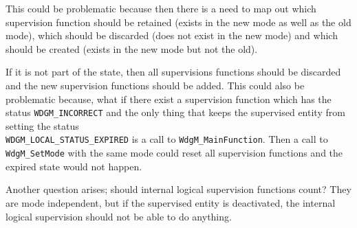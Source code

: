 This could be problematic because then there is a need to map out
which supervision function should be retained (exists in the new mode
as well as the old mode), which should be discarded (does not exist in
the new mode) and which should be created (exists in the new mode but
not the old).

If it is not part of the state, then all supervisions functions should
be discarded and the new supervision functions should be added.  This
could also be problematic because, what if there exist a supervision
function which has the status \lstinline!WDGM_INCORRECT!  and the only
thing that keeps the supervised entity from setting the status\\
\lstinline!WDGM_LOCAL_STATUS_EXPIRED! is a call to
\lstinline!WdgM_MainFunction!. Then a call to \lstinline!WdgM_SetMode!
with the same mode could reset all supervision functions and the
expired state would not happen.

Another question arises; should internal logical supervision functions
count? They are mode independent, but if the supervised entity is
deactivated, the internal logical supervision should not be able to do
anything.

